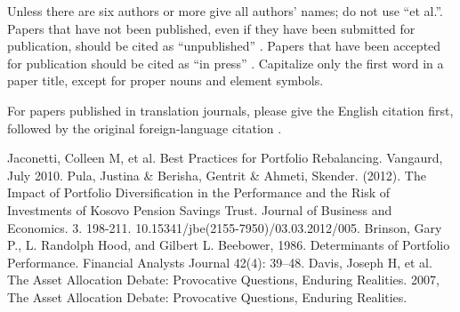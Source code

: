 \documentclass[conference]{IEEEtran}
\begin{document}
Unless there are six authors or more give all authors' names; do not use 
``et al.''. Papers that have not been published, even if they have been 
submitted for publication, should be cited as ``unpublished'' \cite{b4}. Papers 
that have been accepted for publication should be cited as ``in press'' \cite{b5}. 
Capitalize only the first word in a paper title, except for proper nouns and 
element symbols.

For papers published in translation journals, please give the English 
citation first, followed by the original foreign-language citation \cite{b6}.

\begin{thebibliography}{00}
 Jaconetti, Colleen M, et al. Best Practices for Portfolio Rebalancing. Vangaurd, July 2010.
 Pula, Justina \& Berisha, Gentrit \& Ahmeti, Skender. (2012). The Impact of Portfolio Diversification in the Performance and the Risk of Investments of Kosovo Pension Savings Trust. Journal of Business and Economics. 3. 198-211. 10.15341/jbe(2155-7950)/03.03.2012/005. 
 Brinson, Gary P., L. Randolph Hood, and Gilbert L. Beebower, 1986. Determinants of Portfolio Performance. Financial Analysts Journal 42(4): 39–48.
 Davis, Joseph H, et al. The Asset Allocation Debate: Provocative Questions, Enduring Realities. 2007, The Asset Allocation Debate: Provocative Questions, Enduring Realities.

\end{thebibliography}
\end{document}
